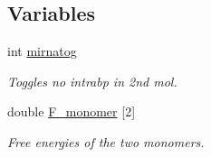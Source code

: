\subsection*{Variables}
\begin{DoxyCompactItemize}
\item 
\mbox{\label{group__pf__cofold_gaff27888c4088cc1f60fd59cbd589474c}} 
int \mbox{\hyperlink{group__pf__cofold_gaff27888c4088cc1f60fd59cbd589474c}{mirnatog}}
\begin{DoxyCompactList}\small\item\em Toggles no intrabp in 2nd mol. \end{DoxyCompactList}\item 
\mbox{\label{group__pf__cofold_gac2d1851a710a8561390861155ca988fe}} 
double \mbox{\hyperlink{group__pf__cofold_gac2d1851a710a8561390861155ca988fe}{F\+\_\+monomer}} \mbox{[}2\mbox{]}
\begin{DoxyCompactList}\small\item\em Free energies of the two monomers. \end{DoxyCompactList}\end{DoxyCompactItemize}
